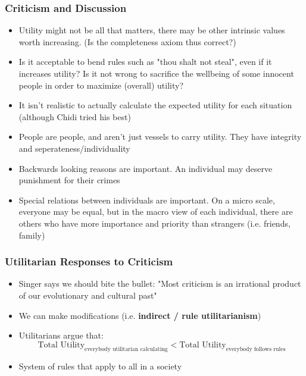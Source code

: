 \documentclass{article}
\begin{document}
        \subsubsection{Criticism and Discussion}
        \begin{itemize}
            \item Utility might not be all that matters, there may be other intrinsic values worth increasing. (Is the completeness axiom thus correct?)
            \item Is it acceptable to bend rules such as "thou shalt not steal", even if it increases utility? Is it not wrong to sacrifice the wellbeing of some innocent people in order to maximize (overall) utility?
            \item It isn't realistic to actually calculate the expected utility for each situation (although Chidi tried his best)
            \item People are people, and aren't just vessels to carry utility. They have integrity and seperateness/individuality
            \item Backwards looking reasons are important. An individual may deserve punishment for their crimes
            \item Special relations between individuals are important. On a micro scale, everyone may be equal, but in the macro view of each individual, there are others who have more importance and priority than strangers (i.e. friends, family)
        \end{itemize}{}
        \subsubsection{Utilitarian Responses to Criticism}
        \begin{itemize}
            \item Singer says we should bite the bullet: "Most criticism is an irrational product of our evolutionary and cultural past"
            \item We can make modifications (i.e. \textbf{indirect / rule utilitarianism})
            \item Utilitarians argue that: $$\textrm{Total Utility}_{\textrm{everybody utilitarian calculating}} < \textrm{Total Utility}_{\textrm{everybody follows rules}}$$
            \item System of rules that apply to all in a society
        \end{itemize}{}
\end{document}
